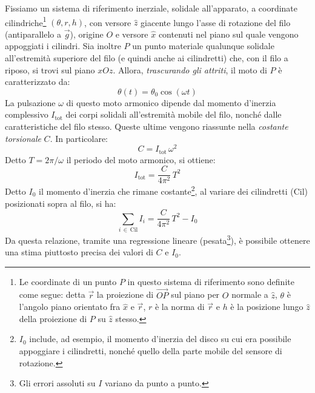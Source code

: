 \documentclass{article}
\begin{document}
Fissiamo un sistema di riferimento inerziale, solidale all'apparato,
a coordinate cilindriche\footnote{
    Le coordinate di un punto $P$ in questo sistema di riferimento sono
    definite come segue: detta $\vec{r}$ la proiezione di $\overrightarrow{OP}$
    sul piano per $O$ normale a $\hat{z}$,
    $\theta$ è l'angolo piano orientato fra $\hat{x}$ e $\vec{r}$,
    $r$ è la norma di $\vec{r}$ e
    $h$ è la posizione lungo $\hat{z}$ della proiezione di $P$ su
    $\hat{z}$ stesso.
} $(\theta, r, h)$, con versore $\hat{z}$ giacente
lungo l'asse di rotazione del filo (antiparallelo a $\vec{g}$),
origine $O$ e versore $\hat{x}$ contenuti nel piano sul quale vengono appoggiati
i cilindri. Sia inoltre $P$ un punto materiale qualunque solidale all'estremità
superiore del filo (e quindi anche ai cilindretti) che, con il filo a riposo,
si trovi sul piano $xOz$.
Allora, \emph{trascurando gli attriti}, il moto di $P$ è caratterizzato da:
\[\theta(t) = \theta_0 \cos(\omega t)\]
La pulsazione $\omega$ di questo moto armonico dipende dal momento d'inerzia
complessivo $I_\text{tot}$ dei corpi solidali all'estremità mobile del filo,
nonché dalle caratteristiche del filo stesso. Queste ultime vengono riassunte
nella \emph{costante torsionale} $C$. In particolare:
\[ C = I_\text{tot}\,\omega^2 \]
Detto $T = 2\pi / \omega$ il periodo del moto armonico, si ottiene:
\[ I_\text{tot} = \frac{C}{4\pi^2}\,T^2 \]
Detto $I_0$ il momento d'inerzia che rimane costante\footnote{
    $I_0$ include, ad esempio, il momento d'inerzia del disco su cui
    era possibile appoggiare i cilindretti, nonché quello della parte mobile
    del sensore di rotazione.
},
al variare dei cilindretti ($\text{Cil}$) posizionati sopra al filo, si ha:
\[ \sum_{i\,\in\,\text{Cil}}\!\!I_i = \frac{C}{4\pi^2}\,T^2 - I_0 \]
Da questa relazione, tramite una regressione lineare (pesata\footnote{
    Gli errori assoluti su $I$ variano da punto a punto.
}), è possibile
ottenere una stima piuttosto precisa dei valori di $C$ e $I_0$.
\end{document}
